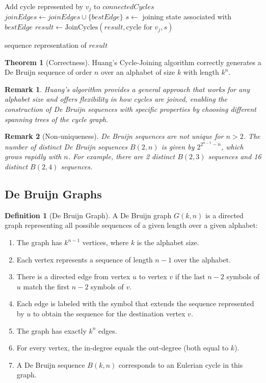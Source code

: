 \documentclass{article}
\newtheorem{remark}{Remark}
\theoremstyle{definition}
\newtheorem{theorem}{Theorem}
\newtheorem{definition}{Definition}
\begin{document}
\begin{algorithm}
\begin{algorithmic}[1]
    \State Add cycle represented by $v_j$ to $connectedCycles$
    \State $joinEdges \gets joinEdges \cup \{bestEdge\}$
    \State $s \gets$ joining state associated with $bestEdge$
    \State $result \gets \text{JoinCycles}(result, \text{cycle for } v_j, s)$
\EndWhile

\State \Return sequence representation of $result$
\end{algorithmic}
\end{algorithm}

\begin{theorem}[Correctness]
Huang's Cycle-Joining algorithm correctly generates a De Bruijn sequence of order $n$ over an alphabet of size $k$ with length $k^n$.
\end{theorem}

\begin{remark}
Huang's algorithm provides a general approach that works for any alphabet size and offers flexibility in how cycles are joined, enabling the construction of De Bruijn sequences with specific properties by choosing different spanning trees of the cycle graph.
\end{remark}


\begin{remark}[Non-uniqueness]
De Bruijn sequences are not unique for $n > 2$. The number of distinct De Bruijn sequences $B(2,n)$ is given by $2^{2^{n-1}-n}$, which grows rapidly with $n$. For example, there are 2 distinct $B(2,3)$ sequences and 16 distinct $B(2,4)$ sequences.
\end{remark}

\subsection{De Bruijn Graphs}
\begin{definition}[De Bruijn Graph]
A De Bruijn graph $G(k,n)$ is a directed graph representing all possible sequences of a given length over a given alphabet:

\begin{enumerate}
    \item The graph has $k^{n-1}$ vertices, where $k$ is the alphabet size.
    \item Each vertex represents a sequence of length $n-1$ over the alphabet.
    \item There is a directed edge from vertex $u$ to vertex $v$ if the last $n-2$ symbols of $u$ match the first $n-2$ symbols of $v$.
    \item Each edge is labeled with the symbol that extends the sequence represented by $u$ to obtain the sequence for the destination vertex $v$.
    \item The graph has exactly $k^n$ edges.
    \item For every vertex, the in-degree equals the out-degree (both equal to $k$).
    \item A De Bruijn sequence $B(k,n)$ corresponds to an Eulerian cycle in this graph.
\end{enumerate}
\end{definition}
\end{document}
